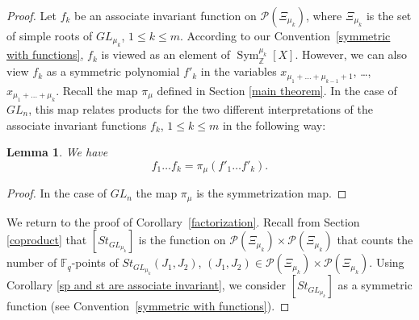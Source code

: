 \documentclass{amsart}
\theoremstyle{plain}
\newtheorem{lemma}[theorem]{Lemma}
\theoremstyle{definition}
\theoremstyle{remark}
\DeclareMathOperator{\Sym}{Sym}
\begin{document}
\begin{proof}
Let $f_k$ be an associate invariant function on $\mathcal{P}(\Xi_{\mu_{k}})$, where $\Xi_{\mu_{k}}$ is the set of simple roots of $GL_{\mu_k}$, $1\leq k\leq m$. According to our Convention~\ref{symmetric with functions}, $f_k$ is viewed as an element of $\Sym_{\mathbb{Z}}^{\mu_{k}}[X]$. However, we can also view $f_k$ as a symmetric polynomial $f'_k$ in the variables $x_{\mu_{1}+\ldots+\mu_{k-1}+1}$, \ldots, $x_{\mu_{1}+\ldots+\mu_k}$. Recall the map $\pi_{\mu}$ defined in Section \ref{main theorem}.
In the case of $GL_n$, this map relates products for the two different interpretations of the associate invariant functions $f_{k}$, $1\leq k\leq m$ in the following way:
\begin{lemma}\label{lm2}
We have
\[
    f_1\ldots f_k=\pi_\mu(f'_1\ldots f'_k).
\]    
\end{lemma}
\begin{proof}
  In the case of $GL_n$ the map $\pi_\mu$ is the symmetrization map.
\end{proof}
We return to the proof of Corollary~\ref{factorization}. Recall from Section \ref{coproduct} that $[St_{GL_{\mu_{k}}}]$ is the function on $\mathcal{P}(\Xi_{\mu_{k}})\times\mathcal{P}(\Xi_{\mu_{k}})$ that counts the number of $\mathbb{F}_{q}$-points of $St_{GL_{\mu_{k}}}(J_{1},J_{2})$, $(J_{1},J_{2})\in\mathcal{P}(\Xi_{\mu_{k}})\times\mathcal{P}(\Xi_{\mu_{k}})$. Using Corollary \ref{sp and st are associate invariant}, we consider $[St_{GL_{\mu_{k}}}]$ as a symmetric function (see Convention~\ref{symmetric with functions}).

\end{proof}
\end{document}
